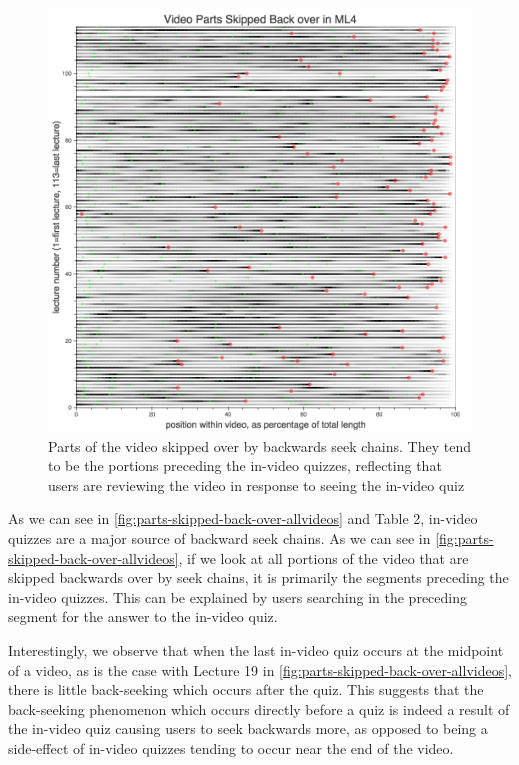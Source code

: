 \documentclass{sigchi}
\begin{document}
\begin{figure}
\includegraphics[width=1.0\columnwidth]{parts-skipped-back-over-allvideos}
\caption{Parts of the video skipped over by backwards seek chains. They tend to be the portions preceding the in-video quizzes, reflecting that users are reviewing the video in response to seeing the in-video quiz}
\label{fig:parts-skipped-back-over-allvideos}
\end{figure}

As we can see in \autoref{fig:parts-skipped-back-over-allvideos} and Table 2, in-video quizzes are a major source of backward seek chains. As we can see in \autoref{fig:parts-skipped-back-over-allvideos}, if we look at all portions of the video that are skipped backwards over by seek chains, it is primarily the segments preceding the in-video quizzes. This can be explained by users searching in the preceding segment for the answer to the in-video quiz. %

Interestingly, we observe that when the last in-video quiz occurs at the midpoint of a video, as is the case with Lecture 19 in \autoref{fig:parts-skipped-back-over-allvideos}, there is little back-seeking which occurs after the quiz. This suggests that the back-seeking phenomenon which occurs directly before a quiz is indeed a result of the in-video quiz causing users to seek backwards more, as opposed to being a side-effect of in-video quizzes tending to occur near the end of the video.
\end{document}
